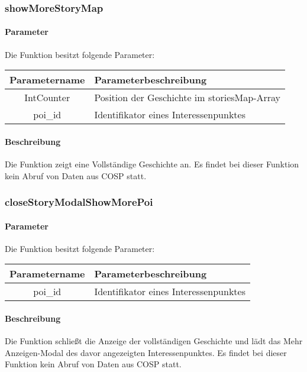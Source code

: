 \subsubsection{showMoreStoryMap}
\paragraph{Parameter} Die Funktion besitzt folgende Parameter:
\begin{table}[H]
	\begin{tabular}{|c|p{11cm}|}
		\hline
		\textbf{Parametername} & \textbf{Parameterbeschreibung} \\ \hline
		IntCounter & Position der Geschichte im {\glqq storiesMap\grqq}-Array \\ \hline
		poi\_id    & Identifikator eines Interessenpunktes \\ \hline
	\end{tabular}
\end{table}
\paragraph{Beschreibung} Die Funktion zeigt eine Vollständige Geschichte an. Es findet bei dieser Funktion kein Abruf von Daten aus {\glqq COSP\grqq} statt.
\subsubsection{closeStoryModalShowMorePoi}
\paragraph{Parameter} Die Funktion besitzt folgende Parameter:
\begin{table}[H]
	\begin{tabular}{|c|p{11cm}|}
		\hline
		\textbf{Parametername} & \textbf{Parameterbeschreibung} \\ \hline
		poi\_id & Identifikator eines Interessenpunktes \\ \hline
	\end{tabular}
\end{table}
\paragraph{Beschreibung} Die Funktion schließt die Anzeige der vollständigen Geschichte und lädt das {\glqq Mehr Anzeigen\grqq}-Modal des davor angezeigten Interessenpunktes. Es findet bei dieser Funktion kein Abruf von Daten aus {\glqq COSP\grqq} statt.
